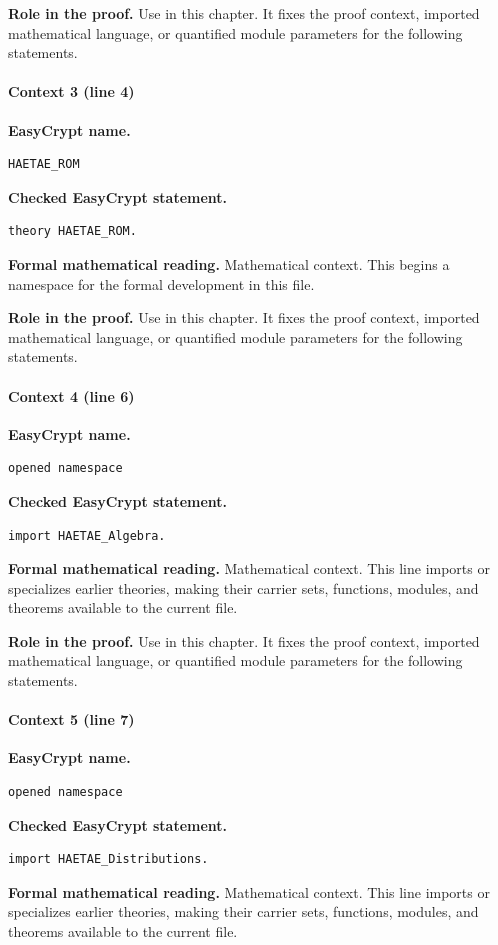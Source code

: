 \noindent\textbf{Role in the proof.}
Use in this chapter. It fixes the proof context, imported mathematical language, or quantified module parameters for the following statements.

\paragraph{Context 3 (line 4)}
\noindent\textbf{EasyCrypt name.}
\begin{lstlisting}[language=EasyCrypt,basicstyle=\ttfamily\scriptsize]
HAETAE_ROM
\end{lstlisting}
\noindent\textbf{Checked EasyCrypt statement.}
\begin{lstlisting}[language=EasyCrypt,basicstyle=\ttfamily\scriptsize]
theory HAETAE_ROM.
\end{lstlisting}
\noindent\textbf{Formal mathematical reading.}
Mathematical context. This begins a namespace for the formal development in this file.

\noindent\textbf{Role in the proof.}
Use in this chapter. It fixes the proof context, imported mathematical language, or quantified module parameters for the following statements.

\paragraph{Context 4 (line 6)}
\noindent\textbf{EasyCrypt name.}
\begin{lstlisting}[language=EasyCrypt,basicstyle=\ttfamily\scriptsize]
opened namespace
\end{lstlisting}
\noindent\textbf{Checked EasyCrypt statement.}
\begin{lstlisting}[language=EasyCrypt,basicstyle=\ttfamily\scriptsize]
import HAETAE_Algebra.
\end{lstlisting}
\noindent\textbf{Formal mathematical reading.}
Mathematical context. This line imports or specializes earlier theories, making their carrier sets, functions, modules, and theorems available to the current file.

\noindent\textbf{Role in the proof.}
Use in this chapter. It fixes the proof context, imported mathematical language, or quantified module parameters for the following statements.

\paragraph{Context 5 (line 7)}
\noindent\textbf{EasyCrypt name.}
\begin{lstlisting}[language=EasyCrypt,basicstyle=\ttfamily\scriptsize]
opened namespace
\end{lstlisting}
\noindent\textbf{Checked EasyCrypt statement.}
\begin{lstlisting}[language=EasyCrypt,basicstyle=\ttfamily\scriptsize]
import HAETAE_Distributions.
\end{lstlisting}
\noindent\textbf{Formal mathematical reading.}
Mathematical context. This line imports or specializes earlier theories, making their carrier sets, functions, modules, and theorems available to the current file.

